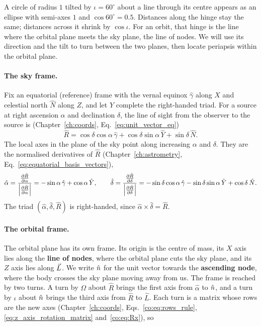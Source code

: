 	A circle of radius $1$ tilted by $\iota=60^\circ$ about a line through its centre appears as an ellipse with semi-axes $1$ and $\cos60^\circ=0.5$. Distances along the hinge stay the same; distances across it shrink by $\cos\iota$. For an orbit, that hinge is the line where the orbital plane meets the sky plane, the line of nodes. We will use its direction and the tilt to turn between the two planes, then locate periapsis within the orbital plane.

	\paragraph{The sky frame.} Fix an equatorial (reference) frame with the vernal equinox $\hat\gamma$ along $X$ and celestial north $\hat N$ along $Z$, and let $\hat Y$ complete the right-handed triad. For a source at right ascension $\alpha$ and declination $\delta$, the line of sight from the observer to the source is (Chapter~\ref{ch:coords}, Eq.~\eqref{eq:unit_vector_eq})
	\[
	\hat R = \cos\delta\cos\alpha\,\hat\gamma+\cos\delta\sin\alpha\,\hat Y+\sin\delta\,\hat N .
	\]
	The local axes in the plane of the sky point along increasing $\alpha$ and $\delta$. They are the normalised derivatives of $\hat R$ (Chapter~\ref{ch:astrometry}, Eq.~\eqref{eq:equatorial_basis_vectors}),
	\[
	\hat\alpha=\frac{\pdv{\hat R}{\alpha}}{\abs{\pdv{\hat R}{\alpha}}}=-\sin\alpha\,\hat\gamma+\cos\alpha\,\hat Y,\qquad
	\hat\delta=\frac{\pdv{\hat R}{\delta}}{\abs{\pdv{\hat R}{\delta}}}=-\sin\delta\cos\alpha\,\hat\gamma-\sin\delta\sin\alpha\,\hat Y+\cos\delta\,\hat N .
	\]
	The triad $(\hat\alpha,\hat\delta,\hat R)$ is right-handed, since $\hat\alpha\times\hat\delta=\hat R$.

	\paragraph{The orbital frame.} The orbital plane has its own frame. Its origin is the centre of mass, its $X$ axis lies along the \textbf{line of nodes}, where the orbital plane cuts the sky plane, and its $Z$ axis lies along $\vec L$. We write $\hat n$ for the unit vector towards the \textbf{ascending node}, where the body crosses the sky plane moving away from us. The frame is reached by two turns. A turn by $\Omega$ about $\hat R$ brings the first axis from $\hat\alpha$ to $\hat n$, and a turn by $\iota$ about $\hat n$ brings the third axis from $\hat R$ to $\hat L$. Each turn is a matrix whose rows are the new axes (Chapter~\ref{ch:coords}, Eqs.~\eqref{co:eq:rows_rule}, \eqref{eq:z_axis_rotation_matrix} and~\eqref{co:eq:Rx}), so

